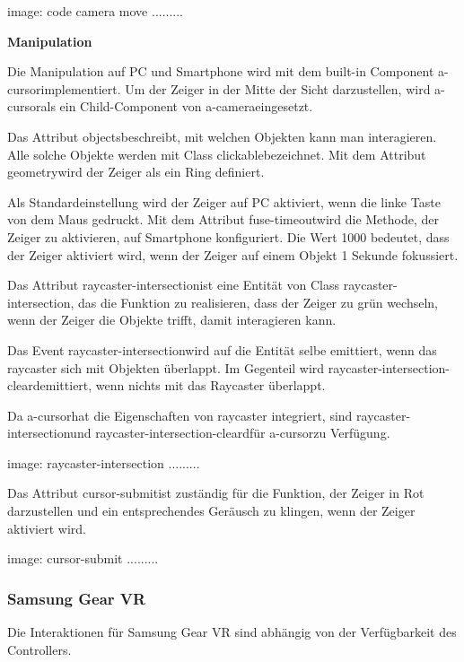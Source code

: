   image: code camera move .........
  
  \textbf{Manipulation}
  
  Die Manipulation auf PC und Smartphone wird mit dem built-in Component \glqq a-cursor\grqq implementiert. Um der Zeiger in der Mitte der Sicht darzustellen, wird \glqq a-cursor\grqq als ein Child-Component von \glqq a-camera\grqq eingesetzt.
  
  Das Attribut \glqq objects\grqq beschreibt, mit welchen Objekten kann man interagieren. Alle solche Objekte werden mit Class \glqq clickable\grqq bezeichnet. Mit dem Attribut \glqq geometry\grqq wird der Zeiger als ein Ring definiert.
  
  Als Standardeinstellung wird der Zeiger auf PC aktiviert, wenn die linke Taste von dem Maus gedruckt. Mit dem Attribut \glqq fuse-timeout\grqq wird die Methode, der Zeiger zu aktivieren, auf Smartphone konfiguriert. Die Wert 1000 bedeutet, dass der Zeiger aktiviert wird, wenn der Zeiger auf einem Objekt 1 Sekunde fokussiert.
  
  Das Attribut \glqq raycaster-intersection\grqq ist eine Entität von Class \glqq raycaster-intersection\grqq, das die Funktion zu realisieren, dass der Zeiger zu grün wechseln, wenn der Zeiger die Objekte trifft, damit interagieren kann.
  
  Das Event \glqq raycaster-intersection\grqq wird auf die Entität selbe emittiert, wenn das raycaster sich mit Objekten überlappt. Im Gegenteil wird \glqq raycaster-intersection-cleard\grqq emittiert, wenn nichts mit das Raycaster überlappt.
  
  Da \glqq a-cursor\grqq hat die Eigenschaften von raycaster integriert, sind \glqq raycaster-intersection\grqq und \glqq raycaster-intersection-cleard\grqq für \glqq a-cursor\grqq zu Verfügung.
  
  image: raycaster-intersection .........
  
  Das Attribut \glqq cursor-submit\grqq ist zuständig für die Funktion, der Zeiger in Rot darzustellen und ein entsprechendes Geräusch zu klingen, wenn der Zeiger aktiviert wird. 
  
  image: cursor-submit .........
  
  \subsubsection{Samsung Gear VR}
  Die Interaktionen für Samsung Gear VR sind abhängig von der Verfügbarkeit des Controllers.
  

